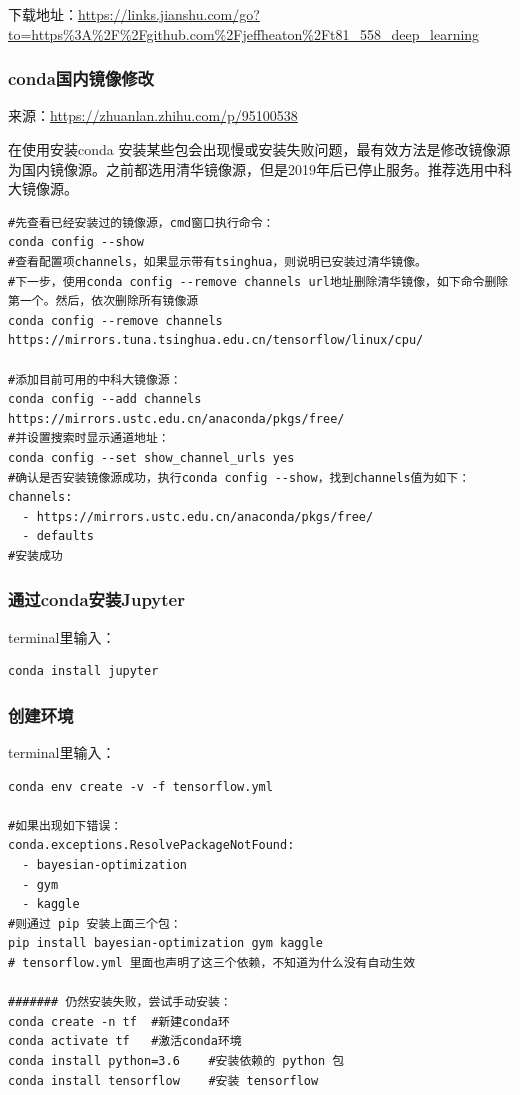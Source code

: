 \documentclass[12pt]{article}
\begin{document}
下载地址：\url{https://links.jianshu.com/go?to=https%3A%2F%2Fgithub.com%2Fjeffheaton%2Ft81_558_deep_learning}

\subsubsection{conda国内镜像修改}
来源：\url{https://zhuanlan.zhihu.com/p/95100538}

在使用安装conda 安装某些包会出现慢或安装失败问题，最有效方法是修改镜像源为国内镜像源。之前都选用清华镜像源，但是2019年后已停止服务。推荐选用中科大镜像源。


\begin{lstlisting}
#先查看已经安装过的镜像源，cmd窗口执行命令：
conda config --show
#查看配置项channels，如果显示带有tsinghua，则说明已安装过清华镜像。
#下一步，使用conda config --remove channels url地址删除清华镜像，如下命令删除第一个。然后，依次删除所有镜像源
conda config --remove channels https://mirrors.tuna.tsinghua.edu.cn/tensorflow/linux/cpu/

#添加目前可用的中科大镜像源：
conda config --add channels https://mirrors.ustc.edu.cn/anaconda/pkgs/free/
#并设置搜索时显示通道地址：
conda config --set show_channel_urls yes
#确认是否安装镜像源成功，执行conda config --show，找到channels值为如下：
channels:
  - https://mirrors.ustc.edu.cn/anaconda/pkgs/free/
  - defaults
#安装成功
\end{lstlisting}

\subsubsection{通过conda安装Jupyter}
terminal里输入：
\begin{lstlisting}
conda install jupyter
\end{lstlisting}

\subsubsection{创建环境}
terminal里输入：
\begin{lstlisting}
conda env create -v -f tensorflow.yml

#如果出现如下错误：
conda.exceptions.ResolvePackageNotFound:
  - bayesian-optimization
  - gym
  - kaggle
#则通过 pip 安装上面三个包：
pip install bayesian-optimization gym kaggle
# tensorflow.yml 里面也声明了这三个依赖，不知道为什么没有自动生效

####### 仍然安装失败，尝试手动安装：
conda create -n tf 	#新建conda环
conda activate tf	#激活conda环境
conda install python=3.6	#安装依赖的 python 包
conda install tensorflow	#安装 tensorflow
\end{lstlisting}
\end{document}
